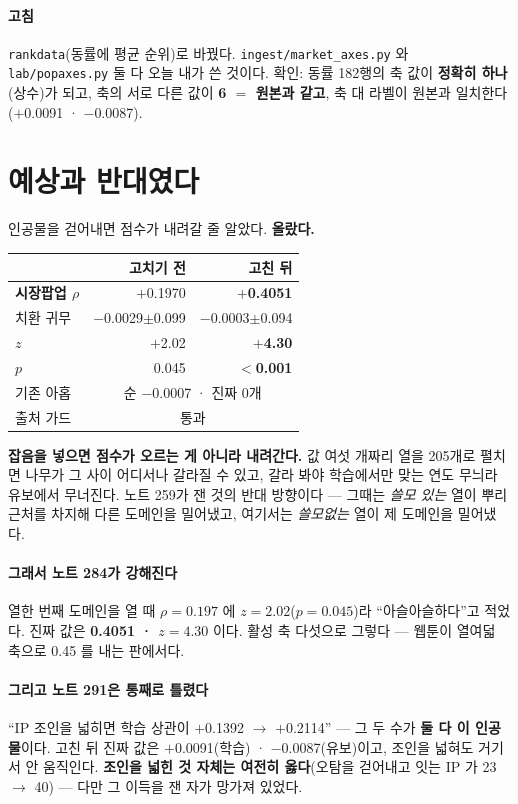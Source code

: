 \documentclass[10pt]{article}
\begin{document}
\paragraph{고침} \texttt{rankdata}(동률에 평균 순위)로 바꿨다.
\texttt{ingest/market\_axes.py} 와 \texttt{lab/popaxes.py} 둘 다 오늘 내가
쓴 것이다. 확인: 동률 182행의 축 값이 \textbf{정확히 하나}(상수)가 되고,
축의 서로 다른 값이 \textbf{6 ${=}$ 원본과 같고}, 축 대 라벨이 원본과 일치한다
($+$0.0091 · $-$0.0087).

\section{예상과 반대였다}

인공물을 걷어내면 점수가 내려갈 줄 알았다. \textbf{올랐다.}

\begin{center}\small
\begin{tabular}{lrr}
\hline
& 고치기 전 & 고친 뒤 \\
\hline
\textbf{시장팝업 $\rho$} & $+$0.1970 & \textbf{$+$0.4051} \\
치환 귀무 & $-$0.0029$\pm$0.099 & $-$0.0003$\pm$0.094 \\
\textbf{$z$} & $+$2.02 & \textbf{$+$4.30} \\
$p$ & 0.045 & \textbf{$<$0.001} \\
\hline
기존 아홉 & \multicolumn{2}{c}{순 $-$0.0007 · 진짜 0개} \\
출처 가드 & \multicolumn{2}{c}{통과} \\
\hline
\end{tabular}
\end{center}

\textbf{잡음을 넣으면 점수가 오르는 게 아니라 내려간다.} 값 여섯 개짜리 열을
205개로 펼치면 나무가 그 사이 어디서나 갈라질 수 있고, 갈라 봐야 학습에서만
맞는 연도 무늬라 유보에서 무너진다. 노트 259가 잰 것의 반대 방향이다 ---
그때는 \emph{쓸모 있는} 열이 뿌리 근처를 차지해 다른 도메인을 밀어냈고,
여기서는 \emph{쓸모없는} 열이 제 도메인을 밀어냈다.

\paragraph{그래서 노트 284가 강해진다} 열한 번째 도메인을 열 때 $\rho{=}0.197$
에 $z{=}2.02$($p{=}0.045$)라 ``아슬아슬하다''고 적었다. 진짜 값은
\textbf{0.4051 · $z{=}4.30$} 이다. 활성 축 다섯으로 그렇다 --- 웹툰이 열여덟
축으로 0.45 를 내는 판에서다.

\paragraph{그리고 노트 291은 통째로 틀렸다} ``IP 조인을 넓히면 학습 상관이
$+$0.1392 $\to$ $+$0.2114'' --- 그 두 수가 \textbf{둘 다 이 인공물}이다.
고친 뒤 진짜 값은 $+$0.0091(학습) · $-$0.0087(유보)이고, 조인을 넓혀도
거기서 안 움직인다. \textbf{조인을 넓힌 것 자체는 여전히 옳다}(오탐을 걷어내고
잇는 IP 가 23 $\to$ 40) --- 다만 그 이득을 잰 자가 망가져 있었다.
\end{document}
